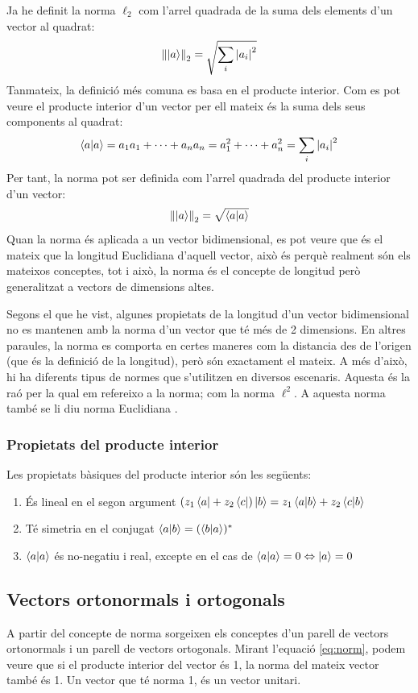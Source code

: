 Ja he definit la norma $\ell_2$ com l'arrel quadrada de la suma dels elements d'un vector al quadrat:
$$
\norm{\ket{a}}_2 = \sqrt{\sum_{i} \abs{a_{i}}^2}
$$
Tanmateix, la definició més comuna es basa en el producte interior. Com es pot veure el producte interior d'un vector per ell mateix és la suma dels seus components al quadrat:
$$
\bra{a}\ket{a} = a_1 a_1 + \cdots + a_n a_n = a_1^2 + \cdots +  a_n^2 \\= \sum_{i} \abs{a_i}^2
$$
Per tant, la norma pot ser definida com l'arrel quadrada del producte interior d'un vector:
\begin{equation}
\norm{\ket{a}}_2 = \sqrt{\bra{a}\ket{a}}
\label{eq:norm}
\end{equation}
Quan la norma és aplicada a un vector bidimensional, es pot veure que és el mateix que la longitud Euclidiana d'aquell vector, això és perquè realment són els mateixos conceptes, tot i això, la norma és el concepte de longitud però generalitzat a vectors de dimensions altes.

Segons el que he vist, algunes propietats de la longitud d'un vector bidimensional no es mantenen amb la norma d'un vector que té més de 2 dimensions. En altres paraules, la norma es comporta en certes maneres com la distancia des de l'origen (que és la definició de la longitud), però són exactament el mateix. A més d'això, hi ha diferents tipus de normes que s'utilitzen en diversos escenaris. Aquesta és la raó per la qual em refereixo a la norma; com la norma $\ell^2$. A aquesta norma també se li diu norma Euclidiana \cite{wolfram:2norm}.

\subsubsection{Propietats del producte interior}
Les propietats bàsiques del producte interior són les següents:
\begin{enumerate}
	\item És lineal en el segon argument $ (z_1\bra{a}+ z_2\bra{c})\ket{b} = z_1\bra{a}\ket{b} + z_2\bra{c}\ket{b}$
	\item Té simetria en el conjugat $\bra{a}\ket{b} = (\bra{b}\ket{a})^*$
	\item $\bra{a}\ket{a}$ és no-negatiu i real, excepte en el cas de $\bra{a}\ket{a} = 0 \Leftrightarrow \ket{a} = 0$
\end{enumerate}

 
\subsection{Vectors ortonormals i ortogonals}
A partir del concepte de norma sorgeixen els conceptes d'un parell de vectors ortonormals i un parell de vectors ortogonals.
Mirant l'equació \eqref{eq:norm}, podem veure que si el producte interior del vector és 1, la norma del mateix vector també és 1. Un vector que té norma 1, és un vector unitari.

